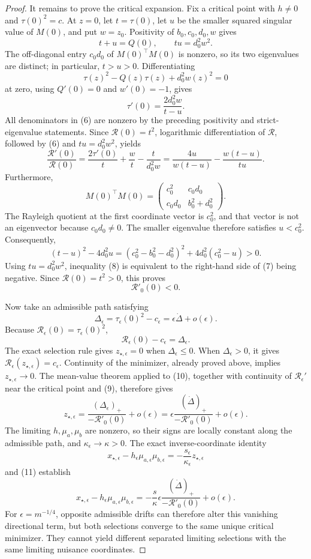 \documentclass{article}
\begin{document}
\begin{proof}
It remains to prove the critical expansion.  Fix a critical point with \(h\neq0\) and \(\tau(0)^2=c\).  At \(z=0\), let \(t=\tau(0)\), let \(u\) be the smaller squared singular value of \(M(0)\), and put \(w=z_0\).  Positivity of \(b_0,c_0,d_0,w\) gives
\[
 t+u=Q(0),
 \qquad
 tu=d_0^2w^2.
\]
The off-diagonal entry \(c_0d_0\) of \(M(0)^{\top}M(0)\) is nonzero, so its two eigenvalues are distinct; in particular, \(t>u>0\).  Differentiating
\[
 \tau(z)^2-Q(z)\tau(z)+d_0^2w(z)^2=0
\]
at zero, using \(Q'(0)=0\) and \(w'(0)=-1\), gives
\[
 \tau'(0)=\frac{2d_0^2w}{t-u}. \tag{6}
\]
All denominators in (6) are nonzero by the preceding positivity and strict-eigenvalue statements.  Since \(\mathcal R(0)=t^2\), logarithmic differentiation of \(\mathcal R\), followed by (6) and \(tu=d_0^2w^2\), yields
\[
 \frac{\mathcal R'(0)}{\mathcal R(0)}
 =\frac{2\tau'(0)}t+\frac wt-\frac{t}{d_0^2w}
 =\frac{4u}{w(t-u)}-\frac{w(t-u)}{tu}. \tag{7}
\]
Furthermore,
\[
 M(0)^{\top}M(0)
 =\begin{pmatrix}c_0^2&c_0d_0\\c_0d_0&b_0^2+d_0^2\end{pmatrix}.
\]
The Rayleigh quotient at the first coordinate vector is \(c_0^2\), and that vector is not an eigenvector because \(c_0d_0\neq0\).  The smaller eigenvalue therefore satisfies \(u<c_0^2\).  Consequently,
\[
 (t-u)^2-4d_0^2u
 =(c_0^2-b_0^2-d_0^2)^2+4d_0^2(c_0^2-u)>0. \tag{8}
\]
Using \(tu=d_0^2w^2\), inequality (8) is equivalent to the right-hand side of (7) being negative.  Since \(\mathcal R(0)=t^2>0\), this proves
\[
 \mathcal R'_0(0)<0. \tag{9}
\]

Now take an admissible path satisfying
\[
 \Delta_\epsilon=\tau_\epsilon(0)^2-c_\epsilon
 =\epsilon\dot\Delta+o(\epsilon).
\]
Because \(\mathcal R_\epsilon(0)=\tau_\epsilon(0)^2\),
\[
 \mathcal R_\epsilon(0)-c_\epsilon=\Delta_\epsilon. \tag{10}
\]
The exact selection rule gives \(z_{\star,\epsilon}=0\) when \(\Delta_\epsilon\leq0\).  When \(\Delta_\epsilon>0\), it gives \(\mathcal R_\epsilon(z_{\star,\epsilon})=c_\epsilon\).  Continuity of the minimizer, already proved above, implies \(z_{\star,\epsilon}\to0\).  The mean-value theorem applied to (10), together with continuity of \(\mathcal R_\epsilon'\) near the critical point and (9), therefore gives
\[
 z_{\star,\epsilon}
 =\frac{(\Delta_\epsilon)_+}{-\mathcal R'_0(0)}+o(\epsilon)
 =\epsilon\frac{(\dot\Delta)_+}{-\mathcal R'_0(0)}+o(\epsilon). \tag{11}
\]
The limiting \(h,\mu_a,\mu_b\) are nonzero, so their signs are locally constant along the admissible path, and \(\kappa_\epsilon\to\kappa>0\).  The exact inverse-coordinate identity
\[
 x_{\star,\epsilon}-h_\epsilon\mu_{a,\epsilon}\mu_{b,\epsilon}
 =-\frac{s_\epsilon}{\kappa_\epsilon}z_{\star,\epsilon}
\]
and (11) establish
\[
 x_{\star,\epsilon}-h_\epsilon\mu_{a,\epsilon}\mu_{b,\epsilon}
 =-\frac{s}{\kappa}\epsilon
 \frac{(\dot\Delta)_+}{-\mathcal R'_0(0)}+o(\epsilon).
\]
For \(\epsilon=m^{-1/4}\), opposite admissible drifts can therefore alter this vanishing directional term, but both selections converge to the same unique critical minimizer.  They cannot yield different separated limiting selections with the same limiting nuisance coordinates.
\end{proof}
\end{document}
